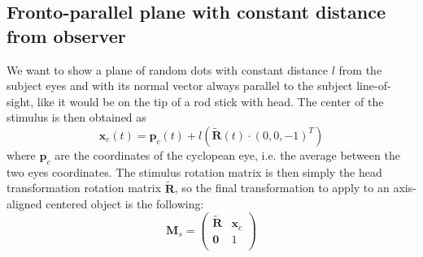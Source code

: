 \documentclass[acmtocl,acmnow]{acmtrans2m}
\begin{document}
\subsection{Fronto-parallel plane with constant distance from observer}
We want to show a plane of random dots with constant distance $l$ from the subject eyes and with its normal vector always parallel to the subject line-of-sight, like it would be on the tip of a rod stick with head.
The center of the stimulus is then obtained as
$$ \mathbf{x}_c(t) = \mathbf{p}_{c}(t) + l \left( \tilde{\mathbf{R}}(t) \cdot (0,0,-1)^T \right) $$
where $\mathbf{p}_c$ are the coordinates of the cyclopean eye, i.e. the average between the two eyes coordinates.
The stimulus rotation matrix is then simply the head transformation rotation matrix $\tilde{\mathbf{R}}$, so the final transformation to apply to an axis-aligned centered object is the following:
\begin{equation}
\mathbf{M}_s =   \begin{pmatrix}
  \tilde{\mathbf{R}} & \mathbf{x}_c \\
  \mathbf{0} & 1 \\ 
  \end{pmatrix}
\end{equation}





\end{document}
